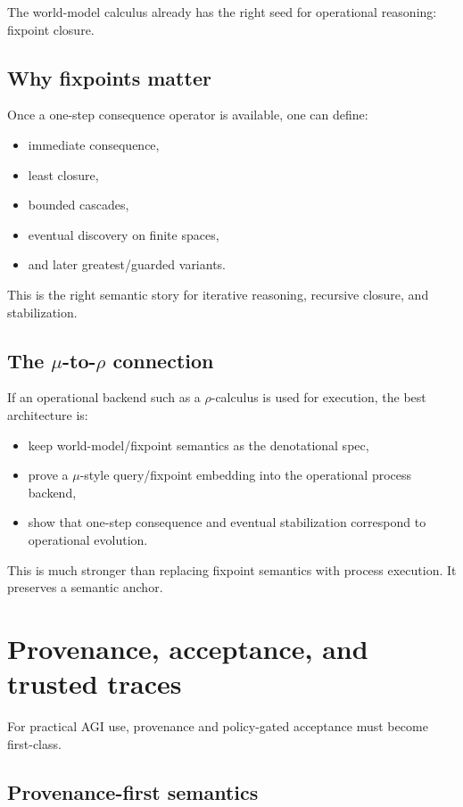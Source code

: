 \documentclass[11pt]{article}
\begin{document}
The world-model calculus already has the right seed for operational reasoning:
fixpoint closure.

\subsection{Why fixpoints matter}

Once a one-step consequence operator is available, one can define:
\begin{itemize}
  \item immediate consequence,
  \item least closure,
  \item bounded cascades,
  \item eventual discovery on finite spaces,
  \item and later greatest/guarded variants.
\end{itemize}

This is the right semantic story for iterative reasoning, recursive closure,
and stabilization.

\subsection{The $\mu$-to-$\rho$ connection}

If an operational backend such as a $\rho$-calculus is used for execution, the
best architecture is:
\begin{itemize}
  \item keep world-model/fixpoint semantics as the denotational spec,
  \item prove a $\mu$-style query/fixpoint embedding into the operational
        process backend,
  \item show that one-step consequence and eventual stabilization correspond to
        operational evolution.
\end{itemize}

This is much stronger than replacing fixpoint semantics with process execution.
It preserves a semantic anchor.

\section{Provenance, acceptance, and trusted traces}

For practical AGI use, provenance and policy-gated acceptance must become
first-class.

\subsection{Provenance-first semantics}
\end{document}

